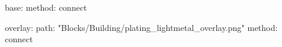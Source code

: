 base:
  method: connect

overlay:
  path: "Blocks/Building/plating_lightmetal_overlay.png"
  method: connect